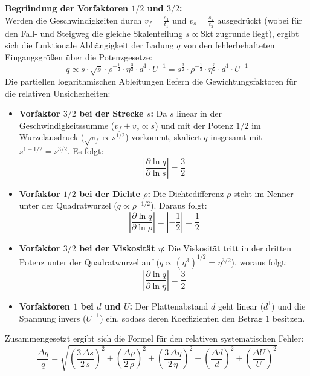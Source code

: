 \documentclass[12pt,a4paper,titlepage]{scrartcl}
\numberwithin{equation}{section}
\numberwithin{table}{section}
\numberwithin{figure}{section}
\begin{document}
\medskip
\noindent
\textbf{Begründung der Vorfaktoren $1/2$ und $3/2$:}\\
Werden die Geschwindigkeiten durch $v_f = \frac{s_1}{t_1}$ und $v_s = \frac{s_2}{t_2}$ ausgedrückt (wobei für den Fall- und Steigweg die gleiche Skalenteilung $s \propto \text{Skt}$ zugrunde liegt), ergibt sich die funktionale Abhängigkeit der Ladung $q$ von den fehlerbehafteten Eingangsgrößen über die Potenzgesetze:
\begin{equation}
    q \propto s \cdot \sqrt{s} \cdot \rho^{-\frac{1}{2}} \cdot \eta^{\frac{3}{2}} \cdot d^1 \cdot U^{-1} = s^{\frac{3}{2}} \cdot \rho^{-\frac{1}{2}} \cdot \eta^{\frac{3}{2}} \cdot d^1 \cdot U^{-1}
\end{equation}
Die partiellen logarithmischen Ableitungen liefern die Gewichtungsfaktoren für die relativen Unsicherheiten:
\begin{itemize}
    \item \textbf{Vorfaktor $3/2$ bei der Strecke $s$:} Da $s$ linear in der Geschwindigkeitssumme ($v_f + v_s \propto s$) und mit der Potenz $1/2$ im Wurzelausdruck ($\sqrt{v_f} \propto s^{1/2}$) vorkommt, skaliert $q$ insgesamt mit $s^{1 + 1/2} = s^{3/2}$. Es folgt:
    \begin{equation}
        \left|\frac{\partial \ln q}{\partial \ln s}\right| = \frac{3}{2}
    \end{equation}
    \item \textbf{Vorfaktor $1/2$ bei der Dichte $\rho$:} Die Dichtedifferenz $\rho$ steht im Nenner unter der Quadratwurzel ($q \propto \rho^{-1/2}$). Daraus folgt:
    \begin{equation}
        \left|\frac{\partial \ln q}{\partial \ln \rho}\right| = \left|-\frac{1}{2}\right| = \frac{1}{2}
    \end{equation}
    \item \textbf{Vorfaktor $3/2$ bei der Viskosität $\eta$:} Die Viskosität tritt in der dritten Potenz unter der Quadratwurzel auf ($q \propto (\eta^3)^{1/2} = \eta^{3/2}$), woraus folgt:
    \begin{equation}
        \left|\frac{\partial \ln q}{\partial \ln \eta}\right| = \frac{3}{2}
    \end{equation}
    \item \textbf{Vorfaktoren $1$ bei $d$ und $U$:} Der Plattenabstand $d$ geht linear ($d^1$) und die Spannung invers ($U^{-1}$) ein, sodass deren Koeffizienten den Betrag $1$ besitzen.
\end{itemize}

\medskip
\noindent
Zusammengesetzt ergibt sich die Formel für den relativen systematischen Fehler:
\begin{equation}
    \frac{\Delta q}{q} = \sqrt{\left(\frac{3\,\Delta s}{2\,s}\right)^2 + \left(\frac{\Delta \rho}{2\,\rho}\right)^2 + \left(\frac{3\,\Delta \eta}{2\,\eta}\right)^2 + \left(\frac{\Delta d}{d}\right)^2 + \left(\frac{\Delta U}{U}\right)^2}
\end{equation}
\end{document}
